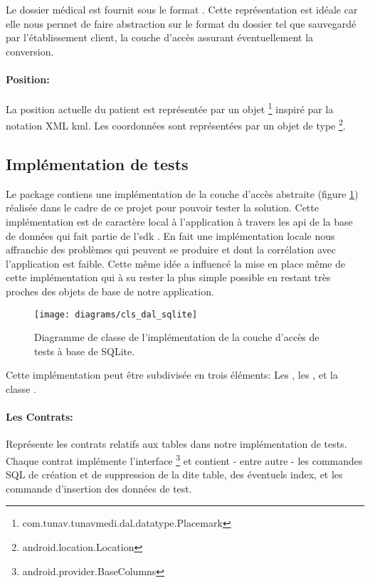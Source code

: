 Le dossier médical est fournit sous le format . Cette représentation est idéale car elle nous permet de faire abstraction sur le format du dossier tel que sauvegardé par l'établissement client, la couche d’accès assurant éventuellement la conversion.


\paragraph{Position:}

La position actuelle du patient est représentée par un objet \footnote{com.tunav.tunavmedi.dal.datatype.Placemark} inspiré par la notation XML \gls{kml}. Les coordonnées sont représentées par un objet de type \footnote{android.location.Location}.

\subsection{Implémentation de tests}\label{subsection:dal_impl}

Le package  contiens une
implémentation de la couche d’accès abstraite (figure
\ref{fig:dal_sqlite}) réalisée dans le cadre de ce projet pour
pouvoir tester la solution. Cette implémentation est de caractère local
à l'application à travers les \gls{api} de la base de données
 qui fait partie de l'\gls{sdk} \android{}. En fait une
implémentation locale nous affranchie des problèmes qui peuvent se
produire et dont la corrélation avec l'application est faible. Cette même
idée a influencé la mise en place même de cette implémentation qui à su
rester la plus simple possible en restant très proches des objets de
base de notre application.

\begin{figure}
\center
\texttt{[image: diagrams/cls\_dal\_sqlite]}
\caption{Diagramme de classe de l'implémentation de la couche d'accès de tests  à base de SQLite.}
\label{fig:dal_sqlite}
\end{figure}

Cette implémentation peut être subdivisée en trois éléments: Les , les , et la classe .

\paragraph{Les Contrats:}

Représente les contrats relatifs aux tables dans notre implémentation de
tests. Chaque contrat implémente l'interface
\footnote{android.provider.BaseColumns} et contient - entre autre - les
commandes SQL de création et de suppression de la dite table, des
éventuels index, et les commande d'insertion des données de test.

